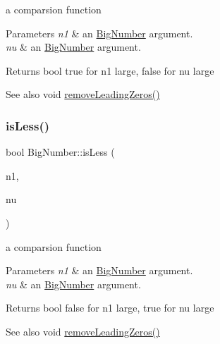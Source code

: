 a comparsion function 


\begin{DoxyParams}{Parameters}
{\em n1} & an \mbox{\hyperlink{class_big_number}{Big\+Number}} argument. \\
\hline
{\em nu} & an \mbox{\hyperlink{class_big_number}{Big\+Number}} argument. \\
\hline
\end{DoxyParams}
\begin{DoxyReturn}{Returns}
bool true for n1 large, false for nu large 
\end{DoxyReturn}
\begin{DoxySeeAlso}{See also}
void \mbox{\hyperlink{class_big_number_ae7ce33d3c89e7f420ad9b110c954007c}{remove\+Leading\+Zeros()}} 
\end{DoxySeeAlso}
\mbox{\label{class_big_number_a8869dba4135101501dd84028088d4766}} 
\subsubsection{\texorpdfstring{isLess()}{isLess()}}
{\footnotesize\ttfamily bool Big\+Number\+::is\+Less (\begin{DoxyParamCaption}\item[{\mbox{\hyperlink{class_big_number}{Big\+Number}}}]{n1,  }\item[{\mbox{\hyperlink{class_big_number}{Big\+Number}}}]{nu }\end{DoxyParamCaption})}



a comparsion function 


\begin{DoxyParams}{Parameters}
{\em n1} & an \mbox{\hyperlink{class_big_number}{Big\+Number}} argument. \\
\hline
{\em nu} & an \mbox{\hyperlink{class_big_number}{Big\+Number}} argument. \\
\hline
\end{DoxyParams}
\begin{DoxyReturn}{Returns}
bool false for n1 large, true for nu large 
\end{DoxyReturn}
\begin{DoxySeeAlso}{See also}
void \mbox{\hyperlink{class_big_number_ae7ce33d3c89e7f420ad9b110c954007c}{remove\+Leading\+Zeros()}} 
\end{DoxySeeAlso}
\mbox{\label{class_big_number_add3aefe34f81093bc56cc8243a4d7161}} 
